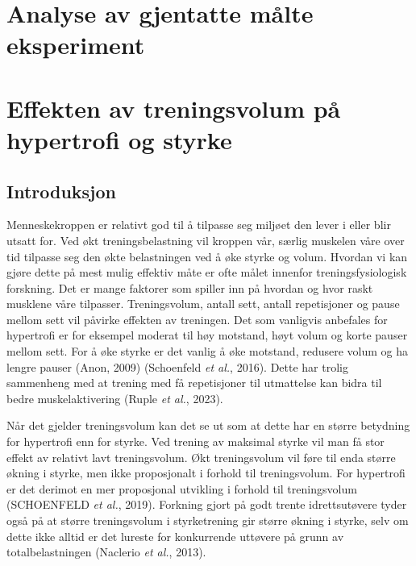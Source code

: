 \documentclass[
  letterpaper,
  DIV=11,
  numbers=noendperiod]{scrreprt}
\begin{document}

\chapter{Analyse av gjentatte målte
eksperiment}\label{analyse-av-gjentatte-muxe5lte-eksperiment}


\chapter{Effekten av treningsvolum på hypertrofi og
styrke}\label{effekten-av-treningsvolum-puxe5-hypertrofi-og-styrke}

\section{Introduksjon}\label{introduksjon-5}

Menneskekroppen er relativt god til å tilpasse seg miljøet den lever i
eller blir utsatt for. Ved økt treningsbelastning vil kroppen vår,
særlig muskelen våre over tid tilpasse seg den økte belastningen ved å
øke styrke og volum. Hvordan vi kan gjøre dette på mest mulig effektiv
måte er ofte målet innenfor treningsfysiologisk forskning. Det er mange
faktorer som spiller inn på hvordan og hvor raskt musklene våre
tilpasser. Treningsvolum, antall sett, antall repetisjoner og pause
mellom sett vil påvirke effekten av treningen. Det som vanligvis
anbefales for hypertrofi er for eksempel moderat til høy motstand, høyt
volum og korte pauser mellom sett. For å øke styrke er det vanlig å øke
motstand, redusere volum og ha lengre pauser (Anon, 2009) (Schoenfeld
\emph{et al.}, 2016). Dette har trolig sammenheng med at trening med få
repetisjoner til utmattelse kan bidra til bedre muskelaktivering (Ruple
\emph{et al.}, 2023).

Når det gjelder treningsvolum kan det se ut som at dette har en større
betydning for hypertrofi enn for styrke. Ved trening av maksimal styrke
vil man få stor effekt av relativt lavt treningsvolum. Økt treningsvolum
vil føre til enda større økning i styrke, men ikke proposjonalt i
forhold til treningsvolum. For hypertrofi er det derimot en mer
proposjonal utvikling i forhold til treningsvolum (SCHOENFELD \emph{et
al.}, 2019). Forkning gjort på godt trente idrettsutøvere tyder også på
at større treningsvolum i styrketrening gir større økning i styrke, selv
om dette ikke alltid er det lureste for konkurrende uttøvere på grunn av
totalbelastningen (Naclerio \emph{et al.}, 2013).
\end{document}
